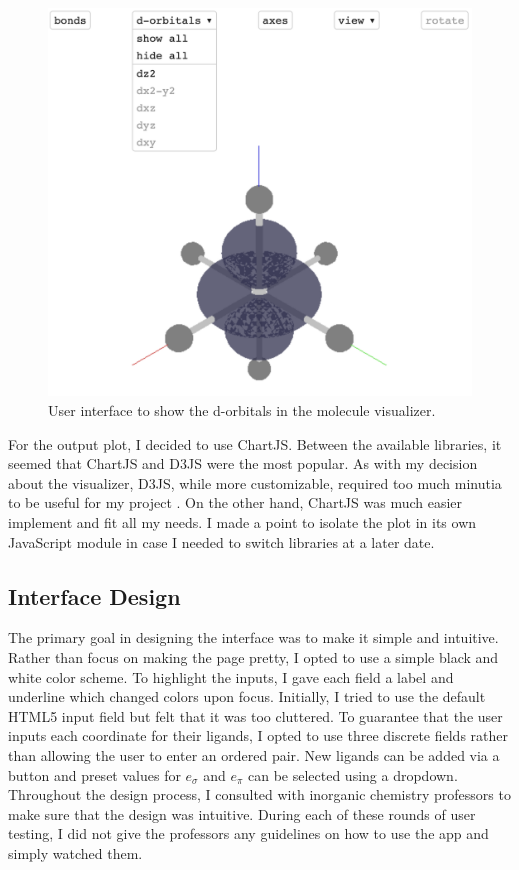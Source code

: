 \documentclass[10pt,twocolumn]{article}
\begin{document}
\begin{figure}
	\centering
	\includegraphics[width=.95\linewidth]{dorbitalsvisualizer.png}
	\caption{
		User interface to show the d-orbitals in the molecule visualizer.
	}
	\label{fig:dorbitals-visualizer}
\end{figure}

For the output plot, I decided to use ChartJS. Between the available libraries, it seemed that ChartJS and D3JS were the most popular. As with my decision about the visualizer, D3JS, while more customizable, required too much minutia to be useful for my project \cite{chartjs,d3,d3_vs_chartjs}. On the other hand, ChartJS was much easier implement and fit all my needs. I made a point to isolate the plot in its own JavaScript module in case I needed to switch libraries at a later date. 

\subsection{Interface Design}
The primary goal in designing the interface was to make it simple and intuitive. Rather than focus on making the page pretty, I opted to use a simple black and white color scheme. To highlight the inputs, I gave each field a label and underline which changed colors upon focus. Initially, I tried to use the default HTML5 input field but felt that it was too cluttered. To guarantee that the user inputs each coordinate for their ligands, I opted to use three discrete fields rather than allowing the user to enter an ordered pair. New ligands can be added via a button and preset values for $e_\sigma$ and $e_\pi$ can be selected using a dropdown. Throughout the design process, I consulted with inorganic chemistry professors to make sure that the design was intuitive. During each of these rounds of user testing, I did not give the professors any guidelines on how to use the app and simply watched them.
\end{document}
